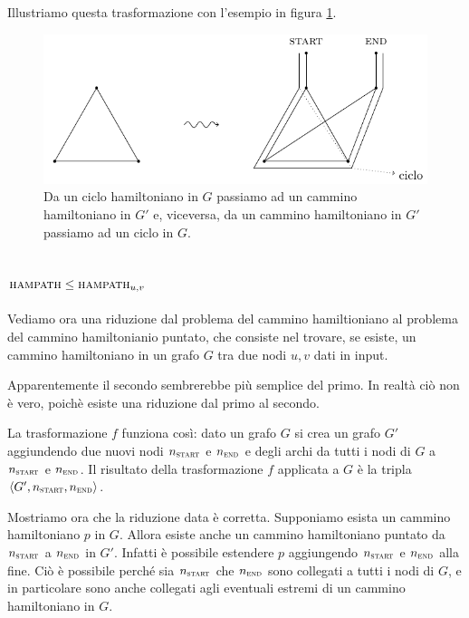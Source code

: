 Illustriamo questa trasformazione con l'esempio in figura \ref{img:HAMCYCLEPATH}.

\begin{figure}[h]
    \begin{center}
        \includegraphics{./img/NPClass/HAMCYCLEPATH.pdf}
        \caption{Da un ciclo hamiltoniano in $G$ passiamo ad un cammino hamiltoniano in $G'$ e,
        viceversa, da un cammino hamiltoniano in $G'$ passiamo ad un ciclo in $G$.}
        \label{img:HAMCYCLEPATH}
    \end{center}
\end{figure}

\subsection{$\textsc{hampath} \leq \textsc{hampath}_{u,v}$}

Vediamo ora una riduzione dal problema del cammino hamiltioniano al problema del cammino
hamiltonianio puntato, che consiste nel trovare, se esiste, un cammino hamiltoniano in un grafo $G$
tra due nodi $u, v$ dati in input.

Apparentemente il secondo sembrerebbe più semplice del primo. In realtà ciò non è vero, poichè
esiste una riduzione dal primo al secondo.

La trasformazione $f$ funziona così: dato un grafo $G$ si crea un grafo $G'$ aggiundendo due nuovi
nodi $n_{\textsc{start}}$ e $n_{\textsc{end}}$ e degli archi da tutti i nodi di $G$ a
$n_{\textsc{start}}$ e $n_{\textsc{end}}$. Il risultato della trasformazione $f$ applicata a $G$ è
la tripla $\langle G',n_{\textsc{start}},n_{\textsc{end}} \rangle$.

Mostriamo ora che la riduzione data è corretta. Supponiamo esista un cammino hamiltoniano $p$ in
$G$. Allora esiste anche un cammino hamiltoniano puntato da $n_{\textsc{start}}$ a
$n_{\textsc{end}}$ in $G'$. Infatti è possibile estendere $p$ aggiungendo $n_{\textsc{start}}$ e
$n_{\textsc{end}}$ alla fine. Ciò è possibile perché sia $n_{\textsc{start}}$ che
$n_{\textsc{end}}$ sono collegati a tutti i nodi di $G$, e in particolare sono anche collegati agli
eventuali estremi di un cammino hamiltoniano in $G$.

